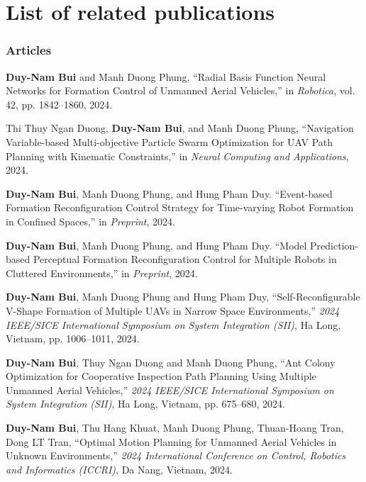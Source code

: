 \chapter*{List of related publications}

\subsection*{Articles}
\textbf{Duy-Nam Bui} and Manh Duong Phung, ``Radial Basis Function Neural Networks for Formation Control of Unmanned Aerial Vehicles,'' in \textit{Robotica}, vol. 42, pp. {1842--1860}, 2024.

Thi Thuy Ngan Duong, \textbf{Duy-Nam Bui}, and Manh Duong Phung, ``Navigation Variable-based Multi-objective Particle Swarm Optimization for UAV Path Planning with Kinematic Constraints,'' in \textit{Neural Computing and Applications}, 2024.

\textbf{Duy-Nam Bui}, Manh Duong Phung, and Hung Pham Duy. ``Event-based Formation Reconfiguration Control Strategy for Time-varying Robot Formation in Confined Spaces,'' in \textit{Preprint}, 2024.

\textbf{Duy-Nam Bui}, Manh Duong Phung, and Hung Pham Duy. ``Model Prediction-based Perceptual Formation Reconfiguration Control for Multiple Robots in Cluttered Environments,'' in \textit{Preprint}, 2024.

\textbf{Duy-Nam Bui}, Manh Duong Phung and Hung Pham Duy, ``Self-Reconfigurable V-Shape Formation of Multiple UAVs in Narrow Space Environments,'' \textit{2024 IEEE/SICE International Symposium on System Integration (SII)}, Ha Long, Vietnam, pp. 1006--1011, 2024.

\textbf{Duy-Nam Bui}, Thuy Ngan Duong and Manh Duong Phung, ``Ant Colony Optimization for Cooperative Inspection Path Planning Using Multiple Unmanned Aerial Vehicles,'' \textit{2024 IEEE/SICE International Symposium on System Integration (SII)}, Ha Long, Vietnam, pp. 675--680, 2024.

\textbf{Duy-Nam Bui}, Thu Hang Khuat, Manh Duong Phung, Thuan-Hoang Tran, Dong LT Tran, ``Optimal Motion Planning for Unmanned Aerial Vehicles in Unknown Environments,'' \textit{2024 International Conference on Control, Robotics and Informatics (ICCRI)}, Da Nang, Vietnam, 2024.


